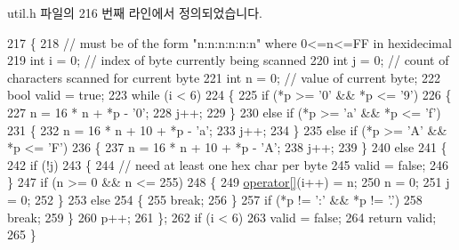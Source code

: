util.\+h 파일의 216 번째 라인에서 정의되었습니다.


\begin{DoxyCode}
217     \{
218         \textcolor{comment}{// must be of the form "n:n:n:n:n:n" where 0<=n<=FF in hexidecimal}
219         \textcolor{keywordtype}{int} i = 0; \textcolor{comment}{// index of byte currently being scanned}
220         \textcolor{keywordtype}{int} j = 0; \textcolor{comment}{// count of characters scanned for current byte}
221         \textcolor{keywordtype}{int} n = 0; \textcolor{comment}{// value of current byte;}
222         \textcolor{keywordtype}{bool} valid = \textcolor{keyword}{true};
223         \textcolor{keywordflow}{while} (i < 6)
224         \{
225             \textcolor{keywordflow}{if} (*p >= \textcolor{charliteral}{'0'} && *p <= \textcolor{charliteral}{'9'})
226             \{
227                 n = 16 * n + *p - \textcolor{charliteral}{'0'};
228                 j++;
229             \}
230             \textcolor{keywordflow}{else} \textcolor{keywordflow}{if} (*p >= \textcolor{charliteral}{'a'} && *p <= \textcolor{charliteral}{'f'})
231             \{
232                 n = 16 * n + 10 + *p - \textcolor{charliteral}{'a'};
233                 j++;
234             \}
235             \textcolor{keywordflow}{else} \textcolor{keywordflow}{if} (*p >= \textcolor{charliteral}{'A'} && *p <= \textcolor{charliteral}{'F'})
236             \{
237                 n = 16 * n + 10 + *p - \textcolor{charliteral}{'A'};
238                 j++;
239             \}
240             \textcolor{keywordflow}{else}
241             \{
242                 \textcolor{keywordflow}{if} (!j)
243                 \{
244                     \textcolor{comment}{// need at least one hex char per byte}
245                     valid = \textcolor{keyword}{false};
246                 \}
247                 \textcolor{keywordflow}{if} (n >= 0 && n <= 255)
248                 \{
249                     \hyperlink{classavdecc__lib_1_1utility_1_1_mac_addr_ad11f67d43ee31b629c7de72957080bc0}{operator[]}(i++) = n;
250                     n = 0;
251                     j = 0;
252                 \}
253                 \textcolor{keywordflow}{else}
254                 \{
255                     \textcolor{keywordflow}{break};
256                 \}
257                 \textcolor{keywordflow}{if} (*p != \textcolor{charliteral}{':'} && *p != \textcolor{charliteral}{'.'})
258                     \textcolor{keywordflow}{break};
259             \}
260             p++;
261         \};
262         \textcolor{keywordflow}{if} (i < 6)
263             valid = \textcolor{keyword}{false};
264         \textcolor{keywordflow}{return} valid;
265     \}
\end{DoxyCode}


